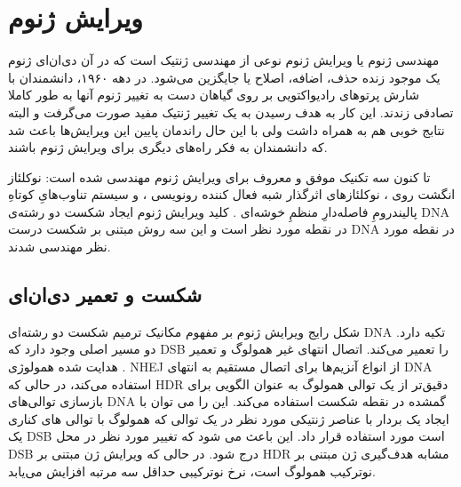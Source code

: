 \documentclass[12pt,a4paper,BCOR=.7cm,headsepline,bibliography=totoc]{report}
\begin{document}
\newpage

\section{ویرایش ژنوم}
مهندسی ژنوم یا ویرایش ژنوم نوعی از مهندسی ژنتیک است که در آن دی‌ان‌ای ژنوم یک موجود زنده حذف، اضافه، اصلاح یا جایگزین می‌شود. در دهه ۱۹۶۰، دانشمندان با شارش پرتو‌های رادیواکتویی بر روی گیاهان دست به تغییر ژنوم‌ آنها به طور کاملا تصادفی زندند. این کار به هدف رسیدن به یک تغییر ژنتیک مفید صورت می‌گرفت و البته نتابج خوبی هم به همراه داشت ولی با این حال راندمان پایین این ویرایش‌ها باعث شد که دانشمندان به فکر راه‌های دیگری برای ویرایش ژنوم باشند.

تا کنون سه تکنیک موفق و معروف برای ویرایش ژنوم مهندسی شده است:
 نوکلئاز انگشت روی 
، نوکلئازهای اثرگذار شبه فعال کننده رونویسی 
، و سیستم تناوب‌هایِ کوتاهِ پالیندرومِ فاصله‌دارِ منظمِ خوشه‌ای
. 
کلید ویرایش ژنوم ایجاد شکست دو رشته‌ی DNA در نقطه مورد نظر است و این سه روش مبتنی بر شکست درست DNA در نقطه مورد نظر مهندسی شدند.
\subsection{ شکست و تعمیر دی‌ان‌ای}

شکل رایج ویرایش ژنوم بر مفهوم مکانیک ترمیم شکست دو رشته‌ای DNA
تکیه دارد. دو مسیر اصلی وجود دارد که DSB را تعمیر می‌کند. اتصال انتهای غیر همولوگ
  و تعمیر هدایت شده همولوژی
   . NHEJ از انواع آنزیم‌ها برای اتصال مستقیم به انتهای DNA استفاده می‌کند، در حالی که HDR دقیق‌تر از یک توالی همولوگ به عنوان الگویی برای بازسازی توالی‌های DNA گمشده در نقطه شکست استفاده می‌کند. این را می توان با ایجاد یک بردار با عناصر ژنتیکی مورد نظر در یک توالی که همولوگ با توالی های کناری یک DSB است مورد استفاده قرار داد. این باعث می شود که تغییر مورد نظر در محل DSB درج شود. در حالی که ویرایش ژن مبتنی بر HDR مشابه هدف‌گیری ژن مبتنی بر نوترکیب همولوگ است، نرخ نوترکیبی حداقل سه مرتبه افزایش می‌یابد.
\end{document}
